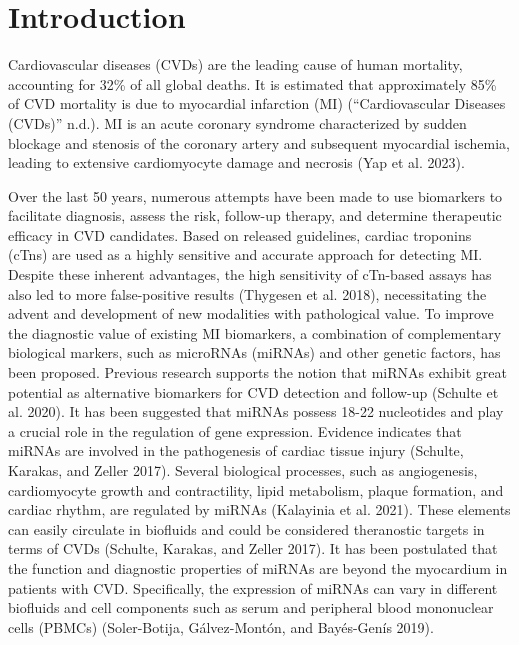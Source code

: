 \documentclass[smallextended]{svjour3}       %
\begin{document}
\hypertarget{introduction}{%
\section{Introduction}\label{introduction}}

Cardiovascular diseases (CVDs) are the leading cause of human mortality,
accounting for 32\% of all global deaths. It is estimated that
approximately 85\% of CVD mortality is due to myocardial infarction (MI)
({``Cardiovascular Diseases ({CVDs})''} n.d.). MI is an acute coronary
syndrome characterized by sudden blockage and stenosis of the coronary
artery and subsequent myocardial ischemia, leading to extensive
cardiomyocyte damage and necrosis (Yap et al. 2023).

Over the last 50 years, numerous attempts have been made to use
biomarkers to facilitate diagnosis, assess the risk, follow-up therapy,
and determine therapeutic efficacy in CVD candidates. Based on released
guidelines, cardiac troponins (cTns) are used as a highly sensitive and
accurate approach for detecting MI. Despite these inherent advantages,
the high sensitivity of cTn-based assays has also led to more
false-positive results (Thygesen et al. 2018), necessitating the advent
and development of new modalities with pathological value. To improve
the diagnostic value of existing MI biomarkers, a combination of
complementary biological markers, such as microRNAs (miRNAs) and other
genetic factors, has been proposed. Previous research supports the
notion that miRNAs exhibit great potential as alternative biomarkers for
CVD detection and follow-up (Schulte et al. 2020). It has been suggested
that miRNAs possess 18-22 nucleotides and play a crucial role in the
regulation of gene expression. Evidence indicates that miRNAs are
involved in the pathogenesis of cardiac tissue injury (Schulte, Karakas,
and Zeller 2017). Several biological processes, such as angiogenesis,
cardiomyocyte growth and contractility, lipid metabolism, plaque
formation, and cardiac rhythm, are regulated by miRNAs (Kalayinia et al.
2021). These elements can easily circulate in biofluids and could be
considered theranostic targets in terms of CVDs (Schulte, Karakas, and
Zeller 2017). It has been postulated that the function and diagnostic
properties of miRNAs are beyond the myocardium in patients with CVD.
Specifically, the expression of miRNAs can vary in different biofluids
and cell components such as serum and peripheral blood mononuclear cells
(PBMCs) (Soler-Botija, Gálvez-Montón, and Bayés-Genís 2019).
\end{document}
